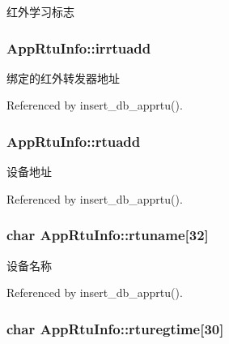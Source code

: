 红外学习标志 

\hypertarget{structAppRtuInfo_a8b72cfd3f9a68f1350484b373da647ab}{
\subsubsection[{irrtuadd}]{ App\-Rtu\-Info\-::irrtuadd}}\label{structAppRtuInfo_a8b72cfd3f9a68f1350484b373da647ab}


绑定的红外转发器地址 



Referenced by insert\-\_\-db\-\_\-apprtu().

\hypertarget{structAppRtuInfo_acbf93c9e6fd07ac0a29f9596d9e59225}{
\subsubsection[{rtuadd}]{ App\-Rtu\-Info\-::rtuadd}}\label{structAppRtuInfo_acbf93c9e6fd07ac0a29f9596d9e59225}


设备地址 



Referenced by insert\-\_\-db\-\_\-apprtu().

\hypertarget{structAppRtuInfo_a55eac142ebeb6bb83b34eb6aaf075991}{
\subsubsection[{rtuname}]{\setlength{\rightskip}{0pt plus 5cm}char App\-Rtu\-Info\-::rtuname\mbox{[}32\mbox{]}}}\label{structAppRtuInfo_a55eac142ebeb6bb83b34eb6aaf075991}


设备名称 



Referenced by insert\-\_\-db\-\_\-apprtu().

\hypertarget{structAppRtuInfo_af67db23fe4859da9266c4de6e0ae0a0f}{
\subsubsection[{rturegtime}]{\setlength{\rightskip}{0pt plus 5cm}char App\-Rtu\-Info\-::rturegtime\mbox{[}30\mbox{]}}}\label{structAppRtuInfo_af67db23fe4859da9266c4de6e0ae0a0f}


